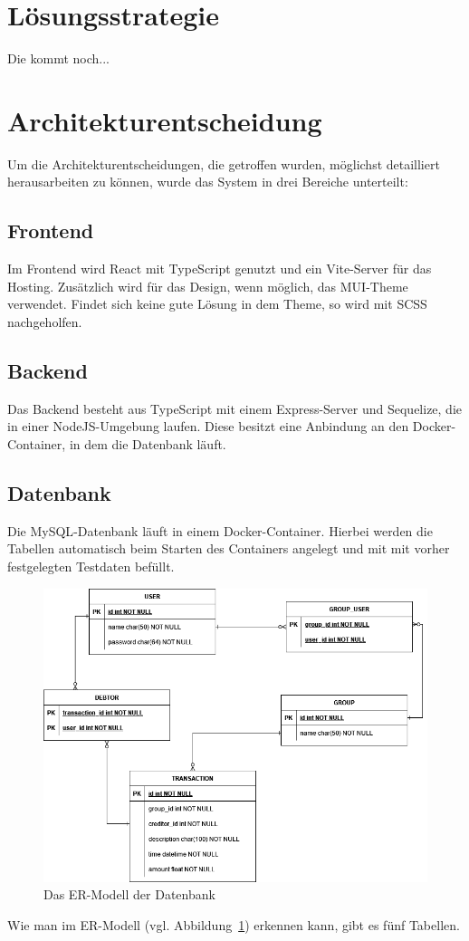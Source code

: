 \documentclass[conference]{IEEEtran}
\begin{document}
\section{Lösungsstrategie}
Die kommt noch...

\section{Architekturentscheidung}
Um die Architekturentscheidungen, die getroffen wurden, möglichst detailliert herausarbeiten zu können, wurde
das System in drei Bereiche unterteilt:
\subsection{Frontend}
Im \gls{Frontend} wird \gls{React} mit \gls{TypeScript} genutzt und ein \gls{Vite}-Server für das Hosting. Zusätzlich wird für das Design, wenn möglich, das \gls{MUI}-Theme verwendet.
Findet sich keine gute Lösung in dem Theme, so wird mit \gls{SCSS} nachgeholfen.
\subsection{Backend}
Das \gls{Backend} besteht aus TypeScript mit einem \gls{Express}-Server und \gls{Sequelize}, die in einer \gls{NodeJS}-Umgebung laufen.
Diese besitzt eine Anbindung an den \gls{Docker}-Container, in dem die Datenbank läuft.
\subsection{Datenbank}
Die \gls{MySQL}-Datenbank läuft in einem Docker-Container. Hierbei werden die Tabellen automatisch beim Starten des Containers angelegt und mit mit vorher festgelegten Testdaten befüllt.
\begin{figure}[h]
    \centering
    \includegraphics[width=\linewidth]{ER_Modell.png}
    \caption[Das ER-Modell der Datenbank]
    {Das ER-Modell der Datenbank}
    \label{fig:erModell}
\end{figure}
Wie man im \gls{ER-Modell} (vgl. Abbildung~\ref{fig:erModell}) erkennen kann, gibt es fünf Tabellen.
\end{document}
